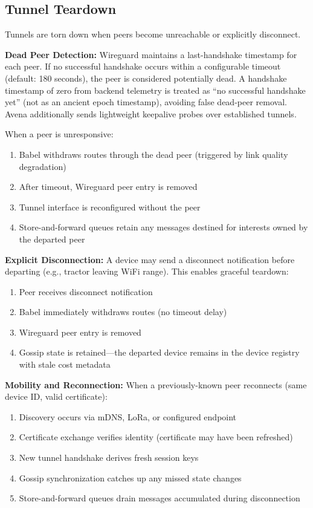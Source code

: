 \subsection{Tunnel Teardown}

Tunnels are torn down when peers become unreachable or explicitly disconnect.

\textbf{Dead Peer Detection:} Wireguard maintains a last-handshake timestamp for each peer. If no successful handshake occurs within a configurable timeout (default: 180 seconds), the peer is considered potentially dead. A handshake timestamp of zero from backend telemetry is treated as ``no successful handshake yet'' (not as an ancient epoch timestamp), avoiding false dead-peer removal. Avena additionally sends lightweight keepalive probes over established tunnels.

When a peer is unresponsive:
\begin{enumerate}
    \item Babel withdraws routes through the dead peer (triggered by link quality degradation)
    \item After timeout, Wireguard peer entry is removed
    \item Tunnel interface is reconfigured without the peer
    \item Store-and-forward queues retain any messages destined for interests owned by the departed peer
\end{enumerate}

\textbf{Explicit Disconnection:} A device may send a disconnect notification before departing (e.g., tractor leaving WiFi range). This enables graceful teardown:
\begin{enumerate}
    \item Peer receives disconnect notification
    \item Babel immediately withdraws routes (no timeout delay)
    \item Wireguard peer entry is removed
    \item Gossip state is retained---the departed device remains in the device registry with stale cost metadata
\end{enumerate}

\textbf{Mobility and Reconnection:} When a previously-known peer reconnects (same device ID, valid certificate):
\begin{enumerate}
    \item Discovery occurs via mDNS, LoRa, or configured endpoint
    \item Certificate exchange verifies identity (certificate may have been refreshed)
    \item New tunnel handshake derives fresh session keys
    \item Gossip synchronization catches up any missed state changes
    \item Store-and-forward queues drain messages accumulated during disconnection
\end{enumerate}

